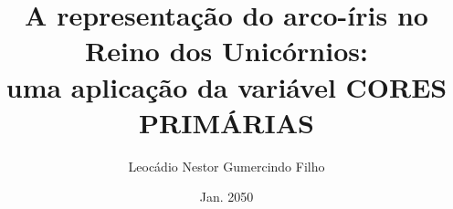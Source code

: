 \author{Leocádio Nestor Gumercindo Filho}
\title{A representação do arco-íris no Reino dos Unicórnios:\\ uma aplicação da variável CORES PRIMÁRIAS}
\date{Jan. 2050}

\newcommand{\instituicao}{Instituto Federal de Pernambuco}
\newcommand{\campus}{Campus Garanhuns}
\newcommand{\curso}{Análise e desenvolvimento de sistemas}
\newcommand{\titulacao}{Tecnólogo}%
\newcommand{\localdefesa}{Garanhuns - PE}
\newcommand{\dataexatadefesa}{01 de jan. \the\year}

\newcommand{\orientador}{Nome Completo do/a Orientador/a}
\newcommand{\printorientador}{(Orientador/a)}
\newcommand{\titorientador}{Dr.}
\newcommand{\localorientador}{Instituto Federal de Pernambuco Campus Garanhuns}

\newcommand{\avaliadorum}{Nome Completo do/a Avaliador/a 1}
\newcommand{\titavaliadorum}{Drª}%
\newcommand{\localavalum}{Universidade Floresta Mágica}%
\newcommand{\avaliadordois}{Nome Completo do/a Avaliador/a 1}
\newcommand{\titavaliadordois}{Me.}%
\newcommand{\localavaldois}{Instituto Bosque das Flores}%

